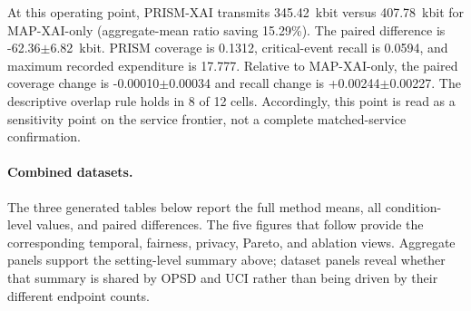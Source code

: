 At this operating point, PRISM-XAI transmits 345.42~kbit versus 407.78~kbit for MAP-XAI-only (aggregate-mean ratio saving 15.29\%). The paired difference is -62.36$\pm$6.82~kbit. PRISM coverage is 0.1312, critical-event recall is 0.0594, and maximum recorded expenditure is 17.777. Relative to MAP-XAI-only, the paired coverage change is -0.00010$\pm$0.00034 and recall change is +0.00244$\pm$0.00227. The descriptive overlap rule holds in 8 of 12 cells. Accordingly, this point is read as a sensitivity point on the service frontier, not a complete matched-service confirmation.

\paragraph{Combined datasets.} The three generated tables below report the full method means, all condition-level values, and paired differences. The five figures that follow provide the corresponding temporal, fairness, privacy, Pareto, and ablation views. Aggregate panels support the setting-level summary above; dataset panels reveal whether that summary is shared by OPSD and UCI rather than being driven by their different endpoint counts.

\begin{table}[p]\centering\tiny

\caption{Public-score threshold $\tau=3$, release cap $M=16$, Combined datasets: complete generated method table.}

\label{tab:thr_3_cap_16:combined:main}

\resizebox{\linewidth}{!}{}

\end{table}\clearpage

\begin{table}[p]\centering\tiny

\caption{Public-score threshold $\tau=3$, release cap $M=16$, Combined datasets: complete condition-level generated table.}

\label{tab:thr_3_cap_16:combined:conditions}

\resizebox{\textwidth}{!}{}

\end{table}\clearpage

\begin{table}[p]\centering\tiny

\caption{Public-score threshold $\tau=3$, release cap $M=16$, Combined datasets: complete generated paired comparisons.}

\label{tab:thr_3_cap_16:combined:paired}

\resizebox{\textwidth}{!}{}

\end{table}\clearpage

